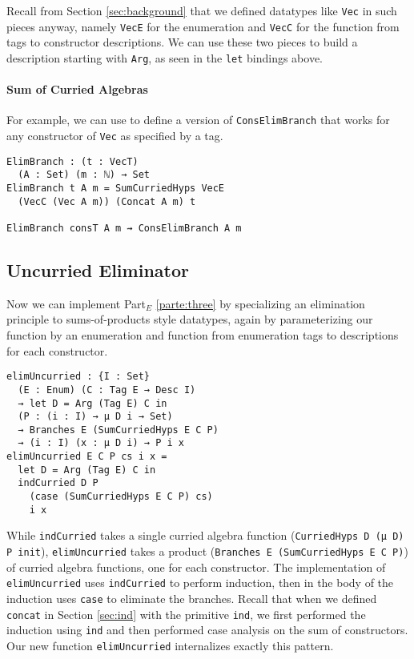 \documentclass[preprint,nonatbib]{sigplanconf}
\newcommand{\refsec}[1]{Section \ref{sec:#1}}
\newcommand{\refparte}[1]{Part$_E$ \ref{parte:#1}}
\begin{document}
Recall from
\refsec{background} that we defined datatypes like {\tt Vec} in such
pieces anyway, namely {\tt VecE} for the enumeration and {\tt VecC}
for the function from tags to constructor descriptions.
We can use these two
pieces to build a description starting with {\tt Arg}, as seen in the
{\tt let} bindings above.

\paragraph{Sum of Curried Algebras}

For example, we can use 
to define a version of
{\tt ConsElimBranch} that works for any constructor of {\tt Vec} as
specified by a tag.

\begin{verbatim}
ElimBranch : (t : VecT)
  (A : Set) (m : ℕ) → Set
ElimBranch t A m = SumCurriedHyps VecE
  (VecC (Vec A m)) (Concat A m) t

ElimBranch consT A m ⇝ ConsElimBranch A m
\end{verbatim}

\subsection{Uncurried Eliminator}

Now we can implement \refparte{three} by specializing an elimination
principle to sums-of-products style datatypes, again by parameterizing
our function by an enumeration and function from enumeration tags to
descriptions for each constructor.

\begin{verbatim}
elimUncurried : {I : Set} 
  (E : Enum) (C : Tag E → Desc I)
  → let D = Arg (Tag E) C in
  (P : (i : I) → μ D i → Set)
  → Branches E (SumCurriedHyps E C P)
  → (i : I) (x : μ D i) → P i x
elimUncurried E C P cs i x =
  let D = Arg (Tag E) C in
  indCurried D P
    (case (SumCurriedHyps E C P) cs)
    i x
\end{verbatim}

While {\tt indCurried} takes a single curried algebra function
({\tt CurriedHyps D (μ D) P init}), {\tt elimUncurried} takes a
product ({\tt Branches E (SumCurriedHyps E C P)})
of curried algebra functions, one for each constructor. The
implementation of {\tt elimUncurried} uses {\tt indCurried} to perform
induction, then in the body of the induction uses {\tt case} to
eliminate the branches. Recall that when we defined {\tt concat} in
\refsec{ind} with the primitive {\tt ind}, we first performed the
induction using {\tt ind} and then performed case analysis on the sum
of constructors. Our new function {\tt elimUncurried} internalizes
exactly this pattern.
\end{document}
